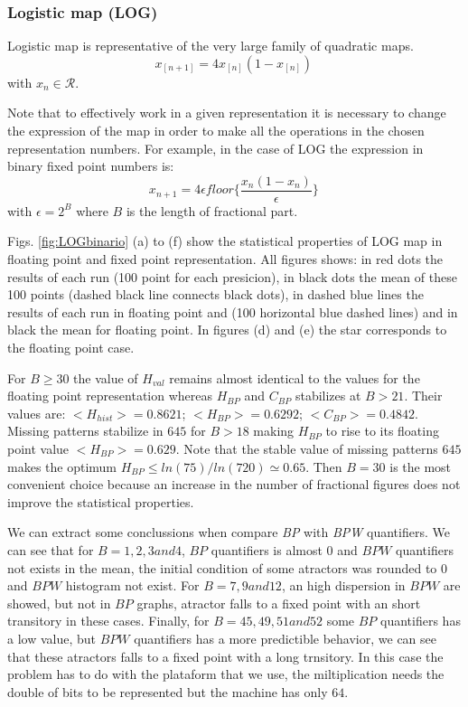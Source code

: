\subsubsection{Logistic map (LOG)} \label{subsubsec:log}

Logistic map is representative of the very large family of quadratic maps. 
\begin{equation}\label{eq:logimap}
 x_{[n+1]}=4x_{[n]}(1-x_{[n]}) \,
\end{equation}
with $x_n\in\mathcal{R}$.

Note that to effectively work in a given representation it is necessary to change the expression of the map in order to make all the operations in the chosen representation numbers. For example, in the case of LOG the expression in binary fixed point numbers is:
\begin{equation}\label{eq:logimapB2}
x_{n+1}=4 \epsilon floor\{\frac{x_n(1-x_n)}{\epsilon}\} \,
\end{equation}
with $\epsilon = 2^B$ where $B$ is the length of fractional part.

Figs. \ref{fig:LOGbinario} (a) to (f) show the statistical properties of LOG map in floating point and fixed point representation.
All figures shows: in red dots the results of each run (100 point for each presicion), in black dots the mean of these 100 points (dashed black line connects black dots), in dashed blue lines the results of each run in floating point and (100 horizontal blue dashed lines) and in black the mean for floating point.
In figures (d) and (e) the star corresponds to the floating point case.

For $B\geq 30$ the value of $H_{val}$ remains almost identical to the values for the floating point representation whereas $H_{BP}$ and $C_{BP}$ stabilizes at $B>21$.
Their values are: $<H_{hist}>=0.8621$; $<H_{BP}>=0.6292$; $<C_{BP}>=0.4842$.
Missing patterns stabilize in $645$ for $B > 18$ making $H_{BP}$ to rise to its floating point value $<H_{BP}>=0.629$.
Note that the stable value of missing patterns $645$ makes the optimum $H_{BP} \leq ln(75)/ln(720) \simeq 0.65$.
Then $B=30$ is the most convenient choice because an increase in the number of fractional figures does not improve the statistical properties.

We can extract some conclussions when compare \textit{BP} with \textit{BPW} quantifiers.
We can see that for $B=1, 2, 3 and 4$, $BP$ quantifiers is almost $0$ and $BPW$ quantifiers not exists in the mean, the initial condition of some atractors was rounded to $0$ and $BPW$ histogram not exist.
For $B=7, 9 and 12$, an high dispersion in $BPW$ are showed, but not in $BP$ graphs, atractor falls to a fixed point with an short transitory in these cases.
Finally, for $B = 45, 49, 51 and 52$ some $BP$ quantifiers has a low value, but $BPW$ quantifiers has a more predictible behavior, we can see that these atractors falls to a fixed point with a long trnsitory.
In this case the problem has to do with the plataform that we use, the miltiplication needs the double of bits to be represented but the machine has only $64$.

